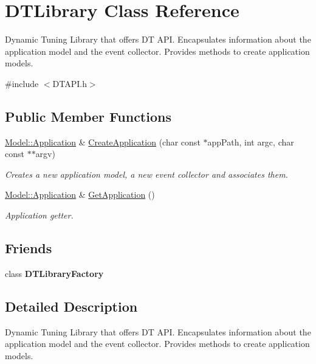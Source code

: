 \hypertarget{class_d_t_library}{\section{D\-T\-Library Class Reference}
\label{class_d_t_library}
}


Dynamic Tuning Library that offers D\-T A\-P\-I. Encapsulates information about the application model and the event collector. Provides methods to create application models.  




{\ttfamily \#include $<$D\-T\-A\-P\-I.\-h$>$}

\subsection*{Public Member Functions}
\begin{DoxyCompactItemize}
\item 
\hyperlink{class_model_1_1_application}{Model\-::\-Application} \& \hyperlink{class_d_t_library_a2ab7686b7b3cd67182ae51a35a40810d}{Create\-Application} (char const $\ast$app\-Path, int argc, char const $\ast$$\ast$argv)
\begin{DoxyCompactList}\small\item\em Creates a new application model, a new event collector and associates them. \end{DoxyCompactList}\item 
\hyperlink{class_model_1_1_application}{Model\-::\-Application} \& \hyperlink{class_d_t_library_aa3f99ffaa5e1ca77cf6033e136249ee9}{Get\-Application} ()
\begin{DoxyCompactList}\small\item\em Application getter. \end{DoxyCompactList}\end{DoxyCompactItemize}
\subsection*{Friends}
\begin{DoxyCompactItemize}
\item 
\hypertarget{class_d_t_library_a73d564540d5bff2dc1f0928a4ff776b2}{class {\bfseries D\-T\-Library\-Factory}}\label{class_d_t_library_a73d564540d5bff2dc1f0928a4ff776b2}

\end{DoxyCompactItemize}


\subsection{Detailed Description}
Dynamic Tuning Library that offers D\-T A\-P\-I. Encapsulates information about the application model and the event collector. Provides methods to create application models. 


